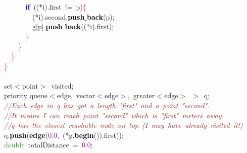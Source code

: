 \documentclass[10pt,a4paper,twoside]{article}
\begin{document}
{{{{{{\mbox{}\ \ \ \ \ \ \ \ \ \ \textbf{\textcolor{Blue}{if}}\ \textcolor{BrickRed}{((*}i\textcolor{BrickRed}{).}first\ \textcolor{BrickRed}{!=}\ p\textcolor{BrickRed}{)}\textcolor{Red}{\{} \\
\mbox{}\ \ \ \ \ \ \ \ \ \ \ \ \textcolor{BrickRed}{(*}i\textcolor{BrickRed}{).}second\textcolor{BrickRed}{.}\textbf{\textcolor{Black}{push$\_$back}}\textcolor{BrickRed}{(}p\textcolor{BrickRed}{);} \\
\mbox{}\ \ \ \ \ \ \ \ \ \ \ \ g\textcolor{BrickRed}{[}p\textcolor{BrickRed}{].}\textbf{\textcolor{Black}{push$\_$back}}\textcolor{BrickRed}{((*}i\textcolor{BrickRed}{).}first\textcolor{BrickRed}{);} \\
\mbox{}\ \ \ \ \ \ \ \ \ \ \textcolor{Red}{\}} \\
\mbox{}\ \ \ \ \ \ \ \ \textcolor{Red}{\}} \\
\mbox{}\ \ \ \ \ \ \textcolor{Red}{\}} \\
\mbox{}\ \ \ \ \textcolor{Red}{\}} \\
\mbox{} \\
\mbox{}\ \ \ \ set\textcolor{BrickRed}{$<$}point\textcolor{BrickRed}{$>$}\ visited\textcolor{BrickRed}{;} \\
\mbox{}\ \ \ \ priority$\_$queue\textcolor{BrickRed}{$<$}edge\textcolor{BrickRed}{,}\ vector\textcolor{BrickRed}{$<$}edge\textcolor{BrickRed}{$>$,}\ greater\textcolor{BrickRed}{$<$}edge\textcolor{BrickRed}{$>$}\ \textcolor{BrickRed}{$>$}\ q\textcolor{BrickRed}{;} \\
\mbox{}\ \ \ \ \textit{\textcolor{Brown}{//Each\ edge\ in\ q\ has\ got\ a\ length\ "{}first"{}\ and\ a\ point\ "{}second"{}.}} \\
\mbox{}\ \ \ \ \textit{\textcolor{Brown}{//It\ means\ I\ can\ reach\ point\ "{}second"{}\ which\ is\ "{}first"{}\ meters\ away.}} \\
\mbox{}\ \ \ \ \textit{\textcolor{Brown}{//q\ has\ the\ closest\ reachable\ node\ on\ top\ (I\ may\ have\ already\ visited\ it!)}} \\
\mbox{}\ \ \ \ q\textcolor{BrickRed}{.}\textbf{\textcolor{Black}{push}}\textcolor{BrickRed}{(}\textbf{\textcolor{Black}{edge}}\textcolor{BrickRed}{(}\textcolor{Purple}{0.0}\textcolor{BrickRed}{,}\ \textcolor{BrickRed}{(*}g\textcolor{BrickRed}{.}\textbf{\textcolor{Black}{begin}}\textcolor{BrickRed}{()).}first\textcolor{BrickRed}{));} \\
\mbox{}\ \ \ \ \textcolor{ForestGreen}{double}\ totalDistance\ \textcolor{BrickRed}{=}\ \textcolor{Purple}{0.0}\textcolor{BrickRed}{;} \\
}}}}}}
\end{document}
